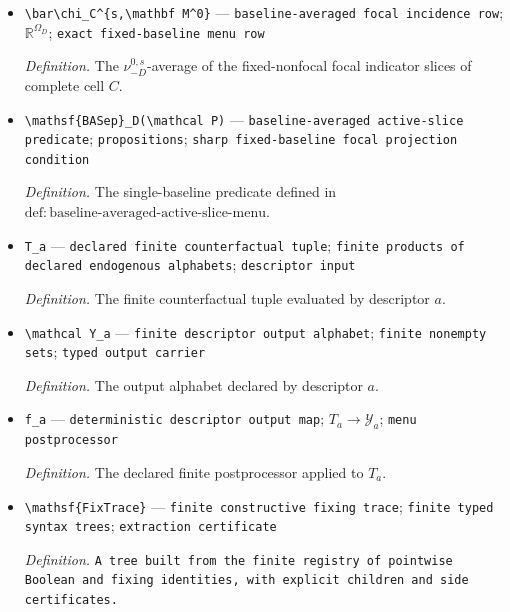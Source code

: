 \documentclass{article}
\begin{document}
\begin{itemize}
  \par\smallskip\noindent\emph{Definition.} The product law of all nonfocal district response profiles in domain \(s\) under the single compatible baseline \(\mathbf M^0\).
  \item \texttt{\textbackslash{}\allowbreak{}bar\textbackslash{}\allowbreak{}chi\_\allowbreak{}C\textasciicircum{}\{s,\allowbreak{}\textbackslash{}\allowbreak{}mathbf M\textasciicircum{}0\}\allowbreak{}} --- \texttt{baseline-\allowbreak{}averaged focal incidence row}; \(\mathbb R^{\Omega_D}\); \texttt{exact fixed-\allowbreak{}baseline menu row}
  \par\smallskip\noindent\emph{Definition.} The \(\nu_{-D}^{0,s}\)-average of the fixed-nonfocal focal indicator slices of complete cell \(C\).
  \item \texttt{\textbackslash{}\allowbreak{}mathsf\{BASep\}\allowbreak{}\_\allowbreak{}D(\textbackslash{}\allowbreak{}mathcal P)} --- \texttt{baseline-\allowbreak{}averaged active-\allowbreak{}slice predicate}; \texttt{propositions}; \texttt{sharp fixed-\allowbreak{}baseline focal projection condition}
  \par\smallskip\noindent\emph{Definition.} The single-baseline predicate defined in \(\mathrm{def:baseline\text{-}averaged\text{-}active\text{-}slice\text{-}menu}\).
  \item \texttt{T\_\allowbreak{}a} --- \texttt{declared finite counterfactual tuple}; \texttt{finite products of declared endogenous alphabets}; \texttt{descriptor input}
  \par\smallskip\noindent\emph{Definition.} The finite counterfactual tuple evaluated by descriptor \(a\).
  \item \texttt{\textbackslash{}\allowbreak{}mathcal Y\_\allowbreak{}a} --- \texttt{finite descriptor output alphabet}; \texttt{finite nonempty sets}; \texttt{typed output carrier}
  \par\smallskip\noindent\emph{Definition.} The output alphabet declared by descriptor \(a\).
  \item \texttt{f\_\allowbreak{}a} --- \texttt{deterministic descriptor output map}; \(T_a\to\mathcal Y_a\); \texttt{menu postprocessor}
  \par\smallskip\noindent\emph{Definition.} The declared finite postprocessor applied to \(T_a\).
  \item \texttt{\textbackslash{}\allowbreak{}mathsf\{FixTrace\}\allowbreak{}} --- \texttt{finite constructive fixing trace}; \texttt{finite typed syntax trees}; \texttt{extraction certificate}
  \par\smallskip\noindent\emph{Definition.} \texttt{A tree built from the finite registry of pointwise Boolean and fixing identities,\allowbreak{} with explicit children and side certificates.}

\end{itemize}
\end{document}
